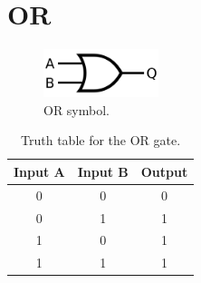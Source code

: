 \section{OR}
	\begin{figure}[H]
	    \centering
	    \includegraphics[width=0.3\textwidth]{figures/symbols/OR.png}
	    \caption{OR symbol.}
	    \label{fig:OR_sym} 
	\end{figure}

    \begin{table}[ht]
    \centering
    \begin{tabular}{|c|c|c|}
        \hline
        Input A & Input B & Output \\
        \hline
        0 & 0 & 0 \\
        0 & 1 & 1 \\
        1 & 0 & 1 \\
        1 & 1 & 1 \\
        \hline
    \end{tabular}
    \caption{Truth table for the OR gate.}
    \end{table}